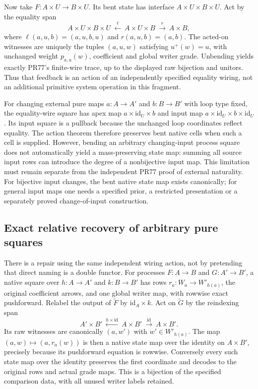 \documentclass{article}
\begin{document}
Now take $F:A\times U\to B\times U$. Its bent state has interface $A\times U\times B\times U$. Act by the equality span
\[A\times U\times B\times U\ \xleftarrow{\ell}\ A\times U\times B\ \xrightarrow{r}\ A\times B,\]
where $\ell(a,u,b)=(a,u,b,u)$ and $r(a,u,b)=(a,b)$. The acted-on witnesses are uniquely the tuples $(a,u,w)$ satisfying $u^+(w)=u$, with unchanged weight $p_{a,u}(w)$, coefficient and global writer grade. Unbending yields exactly PR77's finite-wire trace, up to the displayed raw bijection and unitors. Thus that feedback is an action of an independently specified equality wiring, not an additional primitive system operation in this fragment.

For changing external pure maps $a:A\to A'$ and $b:B\to B'$ with loop type fixed, the equality-wire square has apex map $a\times\mathrm{id}_U\times b$ and input map $a\times\mathrm{id}_U\times b\times\mathrm{id}_U$. Its input square is a pullback because the unchanged loop coordinates reflect equality. The action theorem therefore preserves bent native cells when such a cell is supplied. However, bending an arbitrary changing-input process square does not automatically yield a mass-preserving state map: summing all source input rows can introduce the degree of a nonbijective input map. This limitation must remain separate from the independent PR77 proof of external naturality. For bijective input changes, the bent native state map exists canonically; for general input maps one needs a specified prior, a restricted presentation or a separately proved change-of-input construction.

\subsection*{Exact relative recovery of arbitrary pure squares}
There is a repair using the same independent wiring action, not by pretending that direct naming is a double functor. For processes $F:A\to B$ and $G:A'\to B'$, a native square over $h:A\to A'$ and $k:B\to B'$ has rows $r_a:W_a\to W'_{h(a)}$, the original coefficient arrows, and one global writer map, with rowwise exact pushforward. Relabel the output of $\widetilde F$ by $\mathrm{id}_A\times k$. Act on $\widetilde G$ by the reindexing span
\[A'\times B'\ \xleftarrow{h\times\mathrm{id}}\ A\times B'\ \xrightarrow{\mathrm{id}}\ A\times B'.\]
Its raw witnesses are canonically $(a,w')$ with $w'\in W'_{h(a)}$. The map $(a,w)\mapsto(a,r_a(w))$ is then a native state map over the identity on $A\times B'$, precisely because its pushforward equation is rowwise. Conversely every such state map over the identity preserves the first coordinate and decodes to the original rows and actual grade maps. This is a bijection of the specified comparison data, with all unused writer labels retained.
\end{document}
